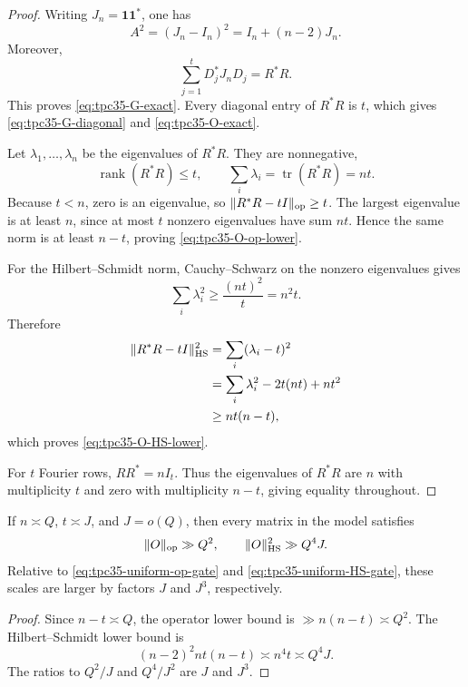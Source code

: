 \begin{proof}
Writing \(J_n=\mathbf1\mathbf1^*\), one has
\begin{equation}
 A^2=(J_n-I_n)^2=I_n+(n-2)J_n.
 \label{eq:tpc35-A-square}
\end{equation}
Moreover,
\[
 \sum_{j=1}^tD_j^*J_nD_j=R^*R.
\]
This proves \eqref{eq:tpc35-G-exact}.  Every diagonal entry of \(R^*R\)
is \(t\), which gives \eqref{eq:tpc35-G-diagonal} and
\eqref{eq:tpc35-O-exact}.

Let \(\lambda_1,\ldots,\lambda_n\) be the eigenvalues of \(R^*R\).
They are nonnegative,
\begin{equation}
 \operatorname{rank}(R^*R)\le t,
 \qquad
 \sum_i\lambda_i=\operatorname{tr}(R^*R)=nt.
 \label{eq:tpc35-R-rank-trace}
\end{equation}
Because \(t<n\), zero is an eigenvalue, so
\(\|R^*R-tI\|_{\operatorname{op}}\ge t\).  The largest eigenvalue is at least \(n\),
since at most \(t\) nonzero eigenvalues have sum \(nt\).  Hence the same
norm is at least \(n-t\), proving \eqref{eq:tpc35-O-op-lower}.

For the Hilbert--Schmidt norm, Cauchy--Schwarz on the nonzero eigenvalues
gives
\[
 \sum_i\lambda_i^2\ge\frac{(nt)^2}{t}=n^2t.
\]
Therefore
\begin{align*}
 \|R^*R-tI\|_{\operatorname{HS}}^2
 &=\sum_i(\lambda_i-t)^2\\
 &=\sum_i\lambda_i^2-2t(nt)+nt^2\\
 &\ge nt(n-t),
\end{align*}
which proves \eqref{eq:tpc35-O-HS-lower}.

For \(t\) Fourier rows, \(RR^*=nI_t\).  Thus the eigenvalues of \(R^*R\)
are \(n\) with multiplicity \(t\) and zero with multiplicity \(n-t\),
giving equality throughout.
\end{proof}

\begin{corollary}
\label{cor:tpc35-aspect-ratio-gap}
If \(n\asymp Q\), \(t\asymp J\), and \(J=o(Q)\), then every matrix in
the model satisfies
\begin{equation}
 \|O\|_{\operatorname{op}}\gg Q^2,
 \qquad
 \|O\|_{\operatorname{HS}}^2\gg Q^4J.
 \label{eq:tpc35-abstract-scales}
\end{equation}
Relative to \eqref{eq:tpc35-uniform-op-gate} and
\eqref{eq:tpc35-uniform-HS-gate}, these scales are larger by factors
\(J\) and \(J^3\), respectively.
\end{corollary}

\begin{proof}
Since \(n-t\asymp Q\), the operator lower bound is
\(\gg n(n-t)\asymp Q^2\).  The Hilbert--Schmidt lower bound is
\[
 (n-2)^2nt(n-t)\asymp n^4t\asymp Q^4J.
\]
The ratios to \(Q^2/J\) and \(Q^4/J^2\) are \(J\) and \(J^3\).
\end{proof}

